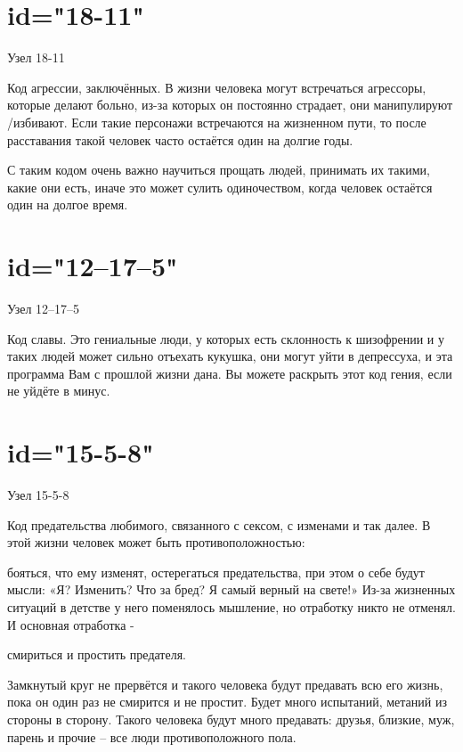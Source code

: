 \section{id="18-11"}{Узел 18-11}
\item Код агрессии, заключённых. В жизни человека могут 
встречаться агрессоры, которые делают больно, из-за которых 
он постоянно страдает, они манипулируют /избивают. Если такие 
персонажи встречаются на жизненном пути, то после расставания 
такой человек часто остаётся один на долгие годы.
\item С таким кодом очень важно научиться прощать людей, 
принимать их такими, какие они есть, иначе это может сулить 
одиночеством, когда человек остаётся один на долгое время.
\endsection

\section{id="12–17–5"}{Узел 12–17–5}
\item Код славы. Это гениальные люди, у которых есть склонность 
к шизофрении и у таких людей может сильно отъехать кукушка, 
они могут уйти в депрессуха, и эта программа Вам с прошлой 
жизни дана. Вы можете раскрыть этот код гения, если не уйдёте 
в минус.
\endsection

\section{id="15-5-8"}{Узел 15-5-8}
\item Код предательства любимого, связанного с сексом, с 
изменами и так далее. В этой жизни человек может быть 
противоположностью:
\item бояться, что ему изменят, остерегаться предательства, 
при этом о себе будут мысли: «Я? Изменить? Что за бред? 
Я самый верный на свете!» Из-за жизненных ситуаций в детстве 
у него поменялось мышление, но отработку никто не отменял. 
И основная отработка -
\item смириться и простить предателя.
\item Замкнутый круг не прервётся и такого человека будут 
предавать всю его жизнь, пока он один раз не смирится и не 
простит. Будет много испытаний, метаний из стороны в сторону. 
Такого человека будут много предавать: друзья, близкие, муж, 
парень и прочие – все люди противоположного пола.
\endsection

